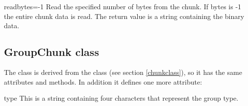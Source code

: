 \begin{methoddesc}{read}{bytes=-1}
Read the specified number of bytes from the chunk.
If bytes is -1 the entire chunk data is read. The return value is a
string containing the binary data.
\end{methoddesc}

\subsection{GroupChunk class}
\label{groupchunkclass}

The  class is derived from the  class (see
section \ref{chunkclass}), so it has the same attributes and methods. In addition
it defines one more attribute:

\begin{memberdesc}{type}
This is a string containing four characters that represent the group type.
\end{memberdesc}

